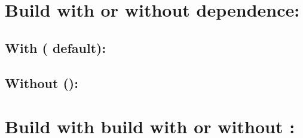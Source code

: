 \documentclass[letterpaper,10pt,english]{sphinxmanual}
\begin{document}
\section{Build  with or without  dependence:}
\label{\detokenize{IntroAndInstall/install:build-g4hepem-with-or-without-geant4-dependence}}

\subsection{With  ( default):}
\label{\detokenize{IntroAndInstall/install:with-geant4-g4hepem-geant4-build-on-default}}
\begin{sphinxVerbatim}[commandchars=\\\{\}]
   
\end{sphinxVerbatim}


\subsection{Without  ():}
\label{\detokenize{IntroAndInstall/install:without-geant4-g4hepem-geant4-build-off}}
\begin{sphinxVerbatim}[commandchars=\\\{\}]
   
\end{sphinxVerbatim}


\section{Build  with  build with or without :}
\label{\detokenize{IntroAndInstall/install:build-hepemshow-with-g4hepem-build-with-or-without-geant4}}
\end{document}
